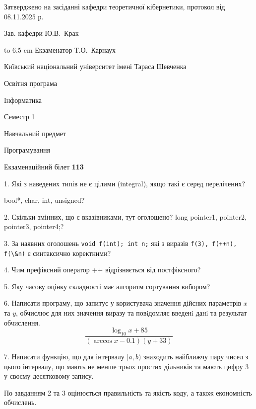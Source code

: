 \documentclass[12pt, ukrainian]{article}
\def\code#1{\Verb!#1!}
\begin{document}
{\smallskip\smallskip \begin {scriptsize} Затверджено на засіданні кафедри теоретичної кібернетики, протокол   від   08.11.2025 р.\par\smallskip\smallskip\smallskip\smallskip
{\parbox {6.5 cm} {Зав. кафедри \dotfill Ю.В.~Крак}}\hspace {0.7cm} {\hbox to 6.5 cm { Екзаменатор \dotfill Т.О.~Карнаух}} \end{scriptsize}}
\newpage
{{\begin {scriptsize}\par
{ \center  Київський національний університет імені Тараса Шевченка \par}
{\parbox {5 cm}{Освітня програма \hfill}{\parbox {7 cm}{Інформатика\hfill}}\parbox {6 cm}{\hfill Семестр 1}}\par
{\parbox {5 cm} {Навчальний предмет \hfill}\parbox {7 cm}{Програмування \hfill}\parbox {6cm}{\hfill}\par}\vspace{-15pt} \end{scriptsize}}{\center Екзаменаційний білет \No \textbf { 113 }\par}}
{%
1. Які з наведених типів не є цілими (integral), якщо такі є серед перелічених?

bool*, char, int, unsigned?
\par
\vspace{2mm}
2. Скільки змінних, що є вказівниками, тут оголошено?
long pointer1, pointer2, pointer3, pointer4;?
\par
\vspace{2mm}
3. За наявних оголошень \code{void f(int); int n;} які з виразів \code{f(3), f(++n), f(\&n)} є синтаксично коректними?
\par
\vspace{2mm}
4. Чим префіксний оператор ++ відрізняється від постфіксного?
\par
\vspace{2mm}
5. Яку часову оцінку складності має алгоритм сортування вибором?
\par
\vspace{2mm}
6. Написати програму, що запитує у користувача значення дійсних параметрів $x$ та $y$, обчислює для них значення виразу та повiдомляє введенi данi та результат обчислення.
$$\frac{\log_{10} x + 85}{(\arccos x - 0.1) (y + 33)}$$ 

\par
7. Написати функцію, що для інтервалу $[a, b)$ знаходить найближчу пару чисел з цього інтервалу, що мають не менше трьох простих дільників та мають цифру 3 у своєму десятковому запису.

По завданням 2 та 3 оцінюється правильність та якість коду, а також економність обчислень.

}
\end{document}
